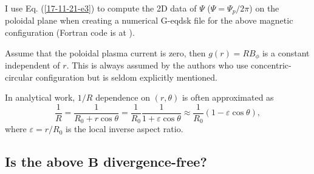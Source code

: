 \documentclass{llncs}
\begin{document}
I use Eq. (\ref{17-11-21-e3}) to compute the 2D data of $\Psi$ ($\Psi = \Psi_p
/ 2 \pi$) on the poloidal plane when creating a numerical G-eqdsk file for the
above magnetic configuration (Fortran code is at
{}).

Assume that the poloidal plasma current is zero, then $g (r) = R B_{\phi}$ is
a constant independent of $r$. This is always assumed by the authors who use
concentric-circular configuration but is seldom explicitly mentioned.

In analytical work, $1 / R$ dependence on $(r, \theta)$ is often approximated
as
\[ \frac{1}{R} = \frac{1}{R_0 + r \cos \theta} = \frac{1}{R_0}  \frac{1}{1 +
   \varepsilon \cos \theta} \approx \frac{1}{R_0} (1 - \varepsilon \cos
   \theta), \]
where $\varepsilon = r / R_0$ is the local inverse aspect ratio.

\subsection{Is the above $\mathbf{B}$ divergence-free?}
\end{document}
